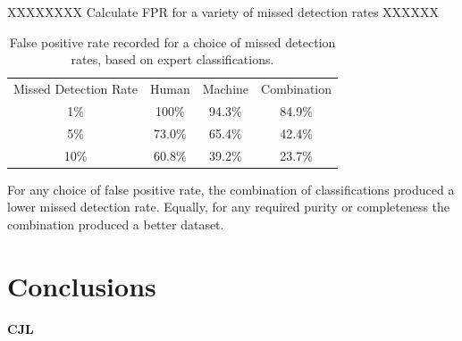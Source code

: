 \documentclass[a4paper,fleqn,usenatbib]{mnras}
\begin{document}
XXXXXXXX Calculate FPR for a variety of missed detection rates XXXXXX

\begin{table}
\begin{tabular}{|c|c|c|c|}
Missed Detection Rate & Human & Machine & Combination\\
1\% & 100\% & 94.3\% & 84.9\% \\
5\% & 73.0\% & 65.4\% & 42.4\% \\
10\% & 60.8\% & 39.2\% & 23.7\%\\
\end{tabular}
\caption{False positive rate recorded for a choice of missed detection rates, based on expert classifications.}\label{tab:roc}
\end{table}

For any choice of false positive rate, the combination of classifications produced a lower missed detection rate. Equally, for any required purity or completeness the combination produced a better dataset. 

\section{Conclusions}

\textbf{CJL}

\bsp	%
\label{lastpage}
\end{document}
